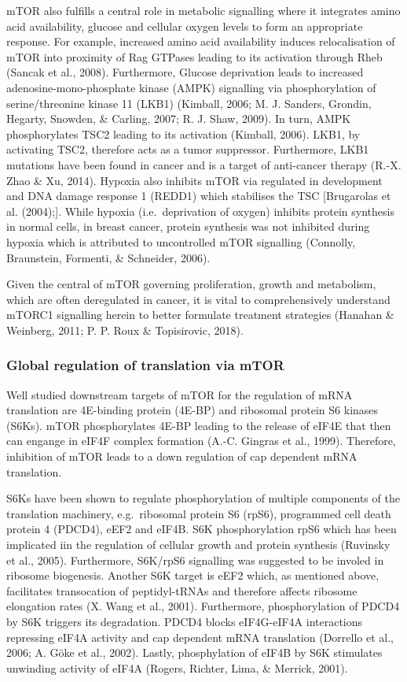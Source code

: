 \documentclass[12pt,openany]{book}
\begin{document}
mTOR also fulfills a central role in metabolic signalling where it
integrates amino acid availability, glucose and cellular oxygen levels
to form an appropriate response. For example, increased amino acid
availability induces relocalisation of mTOR into proximity of Rag
GTPases leading to its activation through Rheb (Sancak et al., 2008).
Furthermore, Glucose deprivation leads to increased
adenosine-mono-phosphate kinase (AMPK) signalling via phosphorylation of
serine/threonine kinase 11 (LKB1) (Kimball, 2006; M. J. Sanders,
Grondin, Hegarty, Snowden, \& Carling, 2007; R. J. Shaw, 2009). In turn,
AMPK phosphorylates TSC2 leading to its activation (Kimball, 2006).
LKB1, by activating TSC2, therefore acts as a tumor suppressor.
Furthermore, LKB1 mutations have been found in cancer and is a target of
anti-cancer therapy (R.-X. Zhao \& Xu, 2014). Hypoxia also inhibits mTOR
via regulated in development and DNA damage response 1 (REDD1) which
stabilises the TSC {[}Brugarolas et al. (2004);{]}. While hypoxia
(i.e.~deprivation of oxygen) inhibits protein synthesis in normal cells,
in breast cancer, protein synthesis was not inhibited during hypoxia
which is attributed to uncontrolled mTOR signalling (Connolly,
Braunstein, Formenti, \& Schneider, 2006).

Given the central of mTOR governing proliferation, growth and
metabolism, which are often deregulated in cancer, it is vital to
comprehensively understand mTORC1 signalling herein to better formulate
treatment strategies (Hanahan \& Weinberg, 2011; P. P. Roux \&
Topisirovic, 2018).

\subsubsection{Global regulation of translation via mTOR}

Well studied downstream targets of mTOR for the regulation of mRNA
translation are 4E-binding protein (4E-BP) and ribosomal protein S6
kinases (S6Ks). mTOR phosphorylates 4E-BP leading to the release of
eIF4E that then can engange in eIF4F complex formation (A.-C. Gingras et
al., 1999). Therefore, inhibition of mTOR leads to a down regulation of
cap dependent mRNA translation.

S6Ks have been shown to regulate phosphorylation of multiple components
of the translation machinery, e.g.~ribosomal protein S6 (rpS6),
programmed cell death protein 4 (PDCD4), eEF2 and eIF4B. S6K
phosphorylation rpS6 which has been implicated iin the regulation of
cellular growth and protein synthesis (Ruvinsky et al., 2005).
Furthermore, S6K/rpS6 signalling was suggested to be involed in ribosome
biogenesis. Another S6K target is eEF2 which, as mentioned above,
facilitates transocation of peptidyl-tRNAs and therefore affects
ribosome elongation rates (X. Wang et al., 2001). Furthermore,
phosphorylation of PDCD4 by S6K triggers its degradation. PDCD4 blocks
eIF4G-eIF4A interactions repressing eIF4A activity and cap dependent
mRNA translation (Dorrello et al., 2006; A. Göke et al., 2002). Lastly,
phosphylation of eIF4B by S6K stimulates unwinding activity of eIF4A
(Rogers, Richter, Lima, \& Merrick, 2001).
\end{document}
